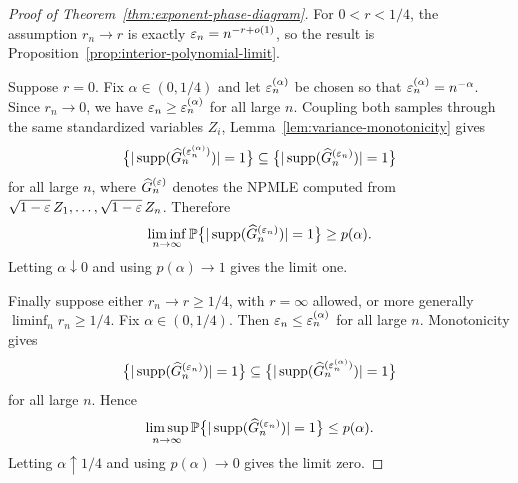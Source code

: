 \begin{proof}[Proof of Theorem~\ref{thm:exponent-phase-diagram}]
For $0<r<1/4$, the assumption $r_n\to r$ is exactly $\varepsilon_n=n^{-r+o(1)}$, so the result is Proposition~\ref{prop:interior-polynomial-limit}.

Suppose $r=0$. Fix $\alpha\in(0,1/4)$ and let $\varepsilon_n^{(\alpha)}$ be chosen so that
$\varepsilon_n^{(\alpha)}=n^{-\alpha}$.
Since $r_n\to0$, we have $\varepsilon_n\ge\varepsilon_n^{(\alpha)}$ for all large $n$. Coupling both samples through the same standardized variables $Z_i$, Lemma~\ref{lem:variance-monotonicity} gives
\[
    \bigl\{|\operatorname{supp}(\widehat G_n^{(\varepsilon_n^{(\alpha)})})|=1\bigr\}
    \subseteq
    \bigl\{|\operatorname{supp}(\widehat G_n^{(\varepsilon_n)})|=1\bigr\}
\]
for all large $n$, where $\widehat G_n^{(\varepsilon)}$ denotes the NPMLE computed from $\sqrt{1-\varepsilon}\,Z_1,\dots,\sqrt{1-\varepsilon}\,Z_n$.
Therefore
\[
    \liminf_{n\to\infty}
    \mathbb P\bigl\{|\operatorname{supp}(\widehat G_n^{(\varepsilon_n)})|=1\bigr\}
    \ge
    p(\alpha).
\]
Letting \(\alpha\downarrow0\) and using \(p(\alpha)\to1\) gives the limit one.

Finally suppose either $r_n\to r\ge1/4$, with $r=\infty$ allowed, or more generally $\liminf_n r_n\ge1/4$. Fix $\alpha\in(0,1/4)$. Then $\varepsilon_n\le\varepsilon_n^{(\alpha)}$ for all large $n$. Monotonicity gives
\[
    \bigl\{|\operatorname{supp}(\widehat G_n^{(\varepsilon_n)})|=1\bigr\}
    \subseteq
    \bigl\{|\operatorname{supp}(\widehat G_n^{(\varepsilon_n^{(\alpha)})})|=1\bigr\}
\]
for all large $n$. Hence
\[
    \limsup_{n\to\infty}
    \mathbb P\bigl\{|\operatorname{supp}(\widehat G_n^{(\varepsilon_n)})|=1\bigr\}
    \le
    p(\alpha).
\]
Letting \(\alpha\uparrow1/4\) and using \(p(\alpha)\to0\) gives the limit zero.
\end{proof}

